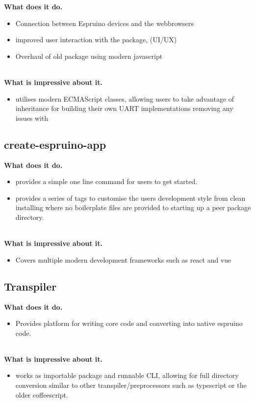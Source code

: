 \documentclass{l4proj}
\begin{document}
\textbf{What does it do.}
\begin{itemize}
    \item Connection between Espruino devices and the webbrowsers
    \item improved user interaction with the package, (UI/UX)
    \item Overhaul of old package using modern javascript
\end{itemize}
\\
\textbf{What is impressive about it.}
\begin{itemize}
    \item utilises modern ECMAScript classes, allowing users to take advantage of inheritance for building their own UART implementations removing any issues with 
\end{itemize}

\subsection{create-espruino-app}

\textbf{What does it do.}
\begin{itemize}
    \item provides a simple one line command for users to get started. 
    \item provides a series of tags to customise the users development style from clean installing where no boilerplate files are provided to starting up a peer package directory.
\end{itemize}
\\
\textbf{What is impressive about it.}
\begin{itemize}
    \item Covers multiple modern development frameworks such as react and vue
\end{itemize}
\subsection{Transpiler}

\textbf{What does it do.}
\begin{itemize}
    \item Provides platform for writing core code and converting into native espruino code.
\end{itemize}
\\
\textbf{What is impressive about it.}
\begin{itemize}
    \item works as importable package and runnable CLI, allowing for full directory conversion similar to other transpiler/preprocessors such as typescript or the older coffeescript.
\end{itemize}
\end{document}
